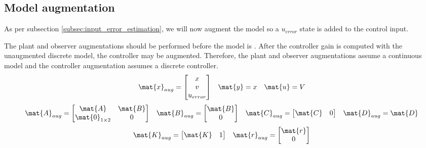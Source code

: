 \subsection{Model augmentation}

As per subsection \ref{subsec:input_error_estimation}, we will now augment the
\gls{model} so a $u_{error}$ state is added to the \gls{control input}.

The \gls{plant} and \gls{observer} augmentations should be performed before the
\gls{model} is . After the \gls{controller}
gain is computed with the unaugmented discrete \gls{model}, the controller may
be augmented. Therefore, the \gls{plant} and \gls{observer} augmentations assume
a continuous \gls{model} and the \gls{controller} augmentation assumes a
discrete \gls{controller}.
\begin{equation*}
  \begin{array}{ccc}
    \mat{x}_{aug} =
    \begin{bmatrix}
      x \\
      v \\
      u_{error}
    \end{bmatrix} &
    \mat{y} = x &
    \mat{u} = V
  \end{array}
\end{equation*}
\begin{equation}
  \begin{array}{cccc}
    \mat{A}_{aug} =
    \begin{bmatrix}
      \mat{A} & \mat{B} \\
      \mat{0}_{1 \times 2} & 0
    \end{bmatrix} &
    \mat{B}_{aug} =
    \begin{bmatrix}
      \mat{B} \\
      0
    \end{bmatrix} &
    \mat{C}_{aug} = \begin{bmatrix}
      \mat{C} & 0
    \end{bmatrix} &
    \mat{D}_{aug} = \mat{D}
  \end{array}
\end{equation}
\begin{equation}
  \begin{array}{cc}
    \mat{K}_{aug} = \begin{bmatrix}
      \mat{K} & 1
    \end{bmatrix} &
    \mat{r}_{aug} = \begin{bmatrix}
      \mat{r} \\
      0
    \end{bmatrix}
  \end{array}
\end{equation}

